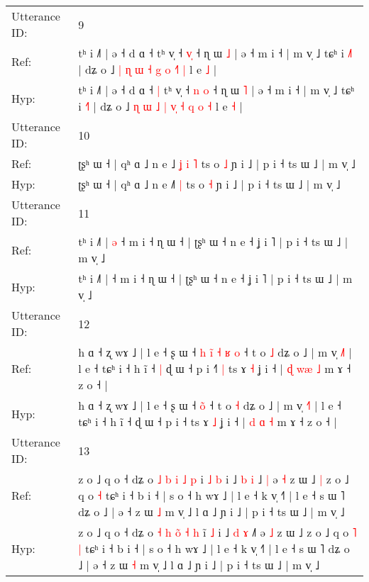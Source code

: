 \documentclass[10pt]{article}
\DeclareRobustCommand{\hl}[1]{{\textcolor{red}{#1}}}
\begin{document}
\begin{longtable}{ll}
 \\
\midrule
Utterance ID: & 9 \\
Ref: & tʰ i ˩˥ | ə ˧ d ɑ ˧\hl{}\hl{} tʰ v̩ ˧ \hl{}\hl{v}\hl{̩} ˧ ɳ ɯ \hl{˩} | ə ˧ m i ˧ | m v̩ ˩ tɕʰ i \hl{˩}˥ | dʑ o ˩ \hl{|} \hl{ɳ} \hl{ɯ} \hl{˧} \hl{}\hl{g} \hl{o} \hl{}\hl{˧}\hl{˥} \hl{|} l e \hl{˩} |
 \\
Hyp: & tʰ i ˩˥ | ə ˧ d ɑ ˧\hl{ }\hl{|} tʰ v̩ ˧ \hl{n}\hl{ }\hl{o} ˧ ɳ ɯ \hl{˥} | ə ˧ m i ˧ | m v̩ ˩ tɕʰ i \hl{˧}˥ | dʑ o ˩ \hl{ɳ} \hl{ɯ} \hl{˩} \hl{|} \hl{v}\hl{̩} \hl{˧} \hl{q}\hl{ }\hl{o} \hl{˧} l e \hl{˧} |
 \\
\midrule
Utterance ID: & 10 \\
Ref: & ʈʂʰ ɯ ˧ | qʰ ɑ ˩ n e ˩\hl{ }\hl{ʝ}\hl{ }\hl{i} \hl{˥} ts o \hl{˩} ɲ i ˩ | p i ˧ ts ɯ ˩ | m v̩ ˩
 \\
Hyp: & ʈʂʰ ɯ ˧ | qʰ ɑ ˩ n e ˩\hl{}\hl{}\hl{}\hl{˥} \hl{|} ts o \hl{˧} ɲ i ˩ | p i ˧ ts ɯ ˩ | m v̩ ˩
 \\
\midrule
Utterance ID: & 11 \\
Ref: & tʰ i ˩˥ |\hl{ }\hl{ə} ˧ m i ˧ ɳ ɯ ˧ | ʈʂʰ ɯ ˧ n e ˧ ʝ i ˥ | p i ˧ ts ɯ ˩ | m v̩ ˩
 \\
Hyp: & tʰ i ˩˥ |\hl{}\hl{} ˧ m i ˧ ɳ ɯ ˧ | ʈʂʰ ɯ ˧ n e ˧ ʝ i ˥ | p i ˧ ts ɯ ˩ | m v̩ ˩
 \\
\midrule
Utterance ID: & 12 \\
Ref: & h ɑ ˧ ʐ wɤ ˩ | l e ˧ ʂ ɯ ˧\hl{ }\hl{h} \hl{i}̃\hl{ }\hl{˧}\hl{ }\hl{ʁ}\hl{ }\hl{o} ˧ t o \hl{˩} dʑ o ˩ | m v̩ \hl{˩}˥ | l e ˧ tɕʰ i ˧ h ĩ ˧\hl{ }\hl{|} ɖ ɯ ˧ p i ˧\hl{˥}\hl{ }\hl{|} ts ɤ \hl{˧} ʝ i ˧ | \hl{ɖ} \hl{w}\hl{æ} \hl{˩} m ɤ ˧ z o ˧ |
 \\
Hyp: & h ɑ ˧ ʐ wɤ ˩ | l e ˧ ʂ ɯ ˧\hl{}\hl{} \hl{o}̃\hl{}\hl{}\hl{}\hl{}\hl{}\hl{} ˧ t o \hl{˧} dʑ o ˩ | m v̩ \hl{˧}˥ | l e ˧ tɕʰ i ˧ h ĩ ˧\hl{}\hl{} ɖ ɯ ˧ p i ˧\hl{}\hl{}\hl{} ts ɤ \hl{˩} ʝ i ˧ | \hl{d} \hl{}\hl{ɑ} \hl{˧} m ɤ ˧ z o ˧ |
 \\
\midrule
Utterance ID: & 13 \\
Ref: & z o ˩ q o ˧ dʑ o \hl{˩} \hl{b} \hl{}\hl{i} \hl{˩} \hl{p} i\hl{ }\hl{˩} \hl{b} i ˩ \hl{b} \hl{i} ˩\hl{ }\hl{|} ə \hl{˧} z ɯ ˩\hl{ }\hl{|} z o ˩ q o\hl{}\hl{} \hl{˧} tɕʰ i ˧ b i ˧ | s o ˧ h wɤ ˩ | l e ˧ k v̩ ˧˥ | l e ˧ s ɯ ˥ dʑ o ˩ | ə ˧ z ɯ \hl{˩} m v̩ ˩ l ɑ ˩ ɲ i ˩ | p i ˧ ts ɯ ˩ | m v̩ ˩
 \\
Hyp: & z o ˩ q o ˧ dʑ o \hl{˧} \hl{h} \hl{o}\hl{̃} \hl{˧} \hl{h} i\hl{}\hl{̃} \hl{˩} i ˩ \hl{d} \hl{ɤ} ˩\hl{}\hl{˥} ə \hl{˩} z ɯ ˩\hl{}\hl{} z o ˩ q o\hl{ }\hl{˥} \hl{|} tɕʰ i ˧ b i ˧ | s o ˧ h wɤ ˩ | l e ˧ k v̩ ˧˥ | l e ˧ s ɯ ˥ dʑ o ˩ | ə ˧ z ɯ \hl{˧} m v̩ ˩ l ɑ ˩ ɲ i ˩ | p i ˧ ts ɯ ˩ | m v̩ ˩

\end{longtable}
\end{document}
